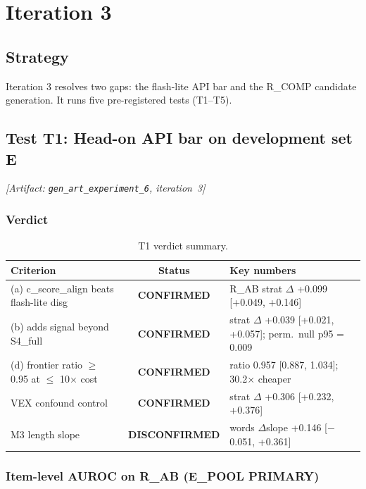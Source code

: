 \documentclass[11pt,letterpaper]{article}
\begin{document}
\section{Iteration 3}

\subsection{Strategy}

Iteration 3 resolves two gaps: the flash-lite API bar and the R\_COMP candidate generation. It runs five pre-registered tests (T1--T5).

\subsection{Test T1: Head-on API bar on development set E}
\label{sec:t1}
\noindent\textit{[Artifact: \texttt{gen\_art\_experiment\_6}, iteration~3]}

\subsubsection{Verdict}

\begin{table}[!htbp]
\centering
\caption{T1 verdict summary.}
\label{tab:t1_verdict}
\footnotesize
\begin{tabular}{p{3.8cm}cp{5.2cm}}
\toprule
Criterion & Status & Key numbers \\
\midrule
(a) c\_score\_align beats flash-lite disg & \textbf{CONFIRMED} & R\_AB strat $\Delta$ +0.099 [+0.049, +0.146] \\
(b) adds signal beyond S4\_full & \textbf{CONFIRMED} & strat $\Delta$ +0.039 [+0.021, +0.057]; perm.\ null p95 = 0.009 \\
(d) frontier ratio $\geq$ 0.95 at $\leq$ 10$\times$ cost & \textbf{CONFIRMED} & ratio 0.957 [0.887, 1.034]; 30.2$\times$ cheaper \\
VEX confound control & \textbf{CONFIRMED} & strat $\Delta$ +0.306 [+0.232, +0.376] \\
M3 length slope & \textbf{DISCONFIRMED} & words $\Delta$slope +0.146 [$-$0.051, +0.361] \\
\bottomrule
\end{tabular}
\end{table}

\subsubsection{Item-level AUROC on R\_AB (E\_POOL PRIMARY)}
\end{document}
